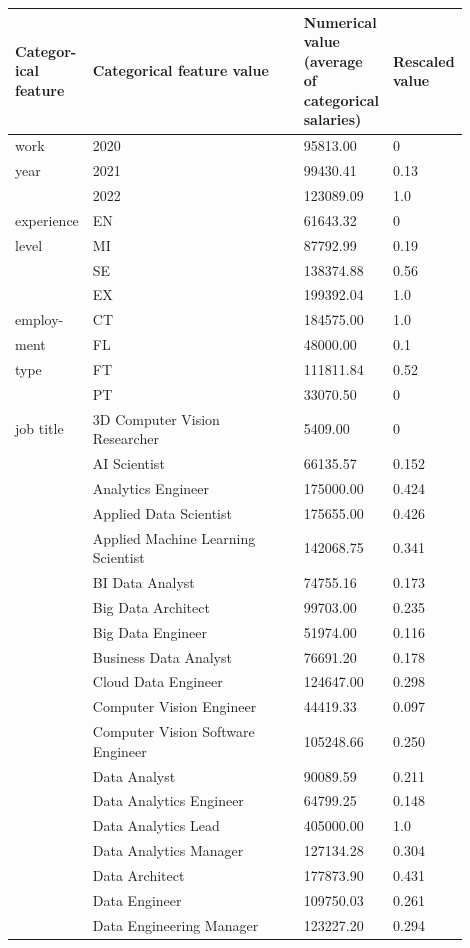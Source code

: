 \documentclass[11pt,a4paper]{article}
\begin{document}
\begin{table}
\centering
\begin{tabular}{p{0.15\linewidth}|p{0.50\linewidth}|p{0.15\linewidth}|p{0.10\linewidth}} \hline
\textbf{Categor-ical feature}&\textbf{Categorical feature value}&\textbf{Numerical value} (average of categorical salaries)&\textbf{Rescaled value}\\ \hline
work&2020&95813.00&0\\
year&2021&99430.41&0.13\\
&2022&123089.09&1.0\\
\hline
experience&EN&61643.32&0\\
level&MI&87792.99&0.19\\
&SE&138374.88&0.56\\
&EX&199392.04&1.0\\
\hline
employ-&CT&184575.00&1.0\\
ment&FL&48000.00&0.1\\
type&FT&111811.84&0.52\\
&PT&33070.50&0\\
\hline
job title&3D Computer Vision Researcher&5409.00&0\\
&AI Scientist&66135.57&0.152\\
&Analytics Engineer&175000.00&0.424\\
&Applied Data Scientist&175655.00&0.426\\
&Applied Machine Learning Scientist&142068.75&0.341\\
&BI Data Analyst&74755.16&0.173\\
&Big Data Architect&99703.00&0.235\\
&Big Data Engineer&51974.00&0.116\\
&Business Data Analyst&76691.20&0.178\\
&Cloud Data Engineer&124647.00&0.298\\
&Computer Vision Engineer&44419.33&0.097\\
&Computer Vision Software Engineer&105248.66&0.250\\
&Data Analyst&90089.59&0.211\\
&Data Analytics Engineer&64799.25&0.148\\
&Data Analytics Lead&405000.00&1.0\\
&Data Analytics Manager&127134.28&0.304\\
&Data Architect&177873.90&0.431\\
&Data Engineer&109750.03&0.261\\
&Data Engineering Manager&123227.20&0.294\\

\end{tabular}
\end{table}
\end{document}
